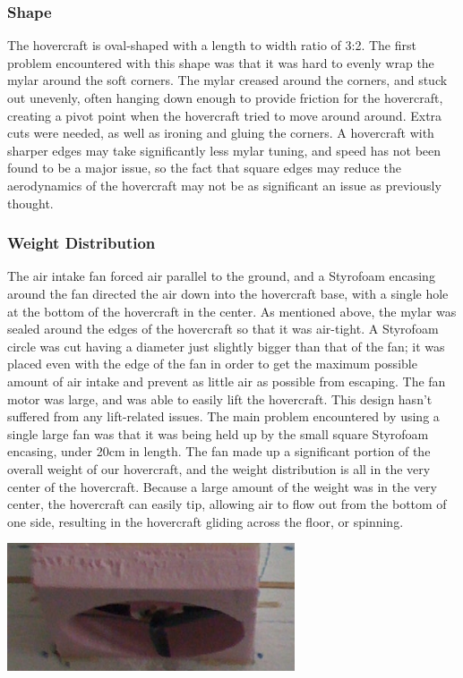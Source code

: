 \subsubsection{Shape}
The hovercraft is oval-shaped with a length to width ratio of 3:2. The first problem encountered with this shape was that it was hard to evenly wrap the mylar around the soft corners. The mylar creased around the corners, and stuck out unevenly, often hanging down enough to provide friction for the hovercraft, creating a pivot point when the hovercraft tried to move around around.  Extra cuts were needed, as well as ironing and gluing the corners.  A hovercraft with sharper edges may take significantly less mylar tuning, and speed has not been found to be a major issue, so the fact that square edges may reduce the aerodynamics of the hovercraft may not be as significant an issue as previously thought.

\subsubsection{Weight Distribution}
The air intake fan forced air parallel to the ground, and a Styrofoam encasing around the fan directed the air down into the hovercraft base, with a single hole at the bottom of the hovercraft in the center. As mentioned above, the mylar was sealed around the edges of the hovercraft so that it was air-tight. A Styrofoam circle was cut having a diameter just slightly bigger than that of the fan; it was placed even with the edge of the fan in order to get the maximum possible amount of air intake and prevent as little air as possible from escaping.  The fan motor was large, and was able to easily lift the hovercraft.  This design hasn't suffered from any lift-related issues. The main problem encountered by using a single large fan was that it was being held up by the small square Styrofoam encasing, under 20cm in length. The fan made up a significant portion of the overall weight of our hovercraft, and the weight distribution is all in the very center of the hovercraft. Because a large amount of the weight was in the very center, the hovercraft can easily tip, allowing air to flow out from the bottom of one side, resulting in the hovercraft gliding across the floor, or spinning.

\begin{minipage}{6.5in}
\begin{center}
  \includegraphics[width=85mm]{imageSources/weightDistro1.png}
\end{center}
\label{weightDistro1}
\end{minipage}

